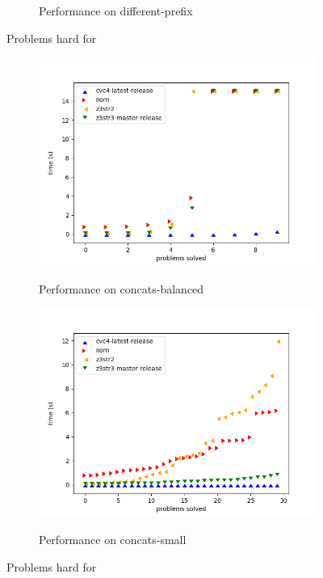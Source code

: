 \begin{figure}[H]
\begin{subfigure}{.5\textwidth}
            \label{fig:different-prefix}
            \caption{Performance on different-prefix}
        \end{subfigure}
        \caption{Problems hard for \cvc{}}
        \label{fig:cvc-hard}
    \end{figure}

    \begin{figure}[H]
        \begin{subfigure}{.5\textwidth}
            \includegraphics[width=\textwidth]{data/graphs/concats-balanced.png}
            \label{fig:concats-balanced}
            \caption{Performance on concats-balanced}
        \end{subfigure}
        \begin{subfigure}{.5\textwidth}
            \includegraphics[width=\textwidth]{data/graphs/concats-small.png}
            \label{fig:concats-small}
            \caption{Performance on concats-small}
        \end{subfigure}
        \caption{Problems hard for \us{}}
        \label{fig:z3str3-hard}
    \end{figure}

